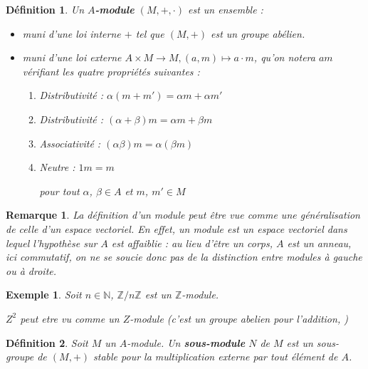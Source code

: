 \documentclass[a4paper,12pt]{report}  %
\theoremstyle{definitionstyle}
\newtheorem{definition}{Définition}[chapter] %
\theoremstyle{examplestyle}
\newtheorem{example}{Exemple}[chapter] %
\theoremstyle{remarkstyle}
\newtheorem{remark}{Remarque}[chapter] %
\theoremstyle{propositionstyle}
\theoremstyle{theoremstyle}
\theoremstyle{proofstyle}
\begin{document}
	\begin{definition}
		Un \textbf{$A$-module} $(M, +, \cdot)$ est un ensemble :
		
		\begin{itemize}
			\item muni d'une loi interne $+$ tel que $(M, +)$ est un groupe abélien.
			\item muni d'une loi externe $A \times M \rightarrow M, (a, m) \mapsto a \cdot m$, qu'on notera $am$ vérifiant les quatre propriétés suivantes :
			\begin{enumerate}
				\item Distributivité : $\alpha(m + m') = \alpha m + \alpha m'$
				\item Distributivité : $(\alpha+\beta)m = \alpha m + \beta m$
				\item Associativité : $(\alpha \beta)m = \alpha(\beta m)$
				\item Neutre : $1m = m$
				
				pour tout $\alpha$, $\beta \in A$ et $m$, $m' \in M$
			\end{enumerate}
		\end{itemize}
	\end{definition}
	
	\begin{remark}
		La définition d'un module peut être vue comme une généralisation de celle d'un espace vectoriel. En effet, un module est un espace vectoriel dans lequel l'hypothèse sur $A$ est affaiblie : au lieu d'être un corps, $A$ est un anneau, ici commutatif, on ne se soucie donc pas de la distinction entre modules à gauche ou à droite.
	\end{remark}

	
	\begin{example}
		Soit $n \in \mathbb{N}$, $\mathbb{Z}/n \mathbb{Z}$ est un $\mathbb{Z}$-module.
		
		$Z^2$ peut etre vu comme un $Z$-module (c'est un groupe abelien pour l'addition, )
	\end{example}

	\begin{definition}
		Soit $M$ un $A$-module. Un \textbf{sous-module} $N$ de $M$ est un sous-groupe de $(M, +)$ stable pour la multiplication externe par tout élément de $A$.
	\end{definition}

	
\end{document}
